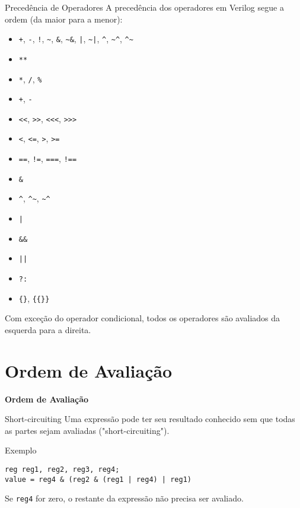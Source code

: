 \documentclass[aspectratio=169,xcolor=dvipsnames]{beamer}
\begin{document}
\begin{frame}[fragile]{Precedência de Operadores}
A precedência dos operadores em Verilog segue a ordem (da maior para a menor):

\begin{itemize}
    \item {\texttt{+}, \texttt{-}, \texttt{!}, \texttt{\textasciitilde}, \texttt{\&}, \texttt{\textasciitilde\&}, \texttt{|}, \texttt{\textasciitilde|}, \texttt{\textasciicircum}, \texttt{\textasciitilde\textasciicircum}, \texttt{\textasciicircum\textasciitilde}}
    \item {\texttt{**}}
    \item {\texttt{*}, \texttt{/}, \texttt{\%}}
    \item {\texttt{+}, \texttt{-}}
    \item {\texttt{<<}, \texttt{>>}, \texttt{<<<}, \texttt{>>>}}
    \item {\texttt{<}, \texttt{<=}, \texttt{>}, \texttt{>=}}
    \item {\texttt{==}, \texttt{!=}, \texttt{===}, \texttt{!==}}
    \item {\texttt{\&}}
    \item {\texttt{\textasciicircum}, \texttt{\textasciicircum\textasciitilde}, \texttt{\textasciitilde\textasciicircum}}
    \item {\texttt{|}}
    \item {\texttt{\&\&}}
    \item {\texttt{||}}
    \item {\texttt{?:}}
    \item {\texttt{\{\}}, \texttt{\{\{\}\}}}
\end{itemize}
\scriptsize{Com exceção do operador condicional, todos os operadores são avaliados da esquerda para a direita.}
\end{frame}

\section{Ordem de Avaliação}

\begin{frame}
    \Huge{\centerline{\textbf{Ordem de Avaliação}}}
\end{frame}

\begin{frame}[fragile]{Short-circuiting}
Uma expressão pode ter seu resultado conhecido sem que todas as partes sejam avaliadas ("short-circuiting").

\begin{block}{Exemplo}
\begin{verbatim}
reg reg1, reg2, reg3, reg4;
value = reg4 & (reg2 & (reg1 | reg4) | reg1)
\end{verbatim}
\end{block}

Se \texttt{reg4} for zero, o restante da expressão não precisa ser avaliado.
\end{frame}
\end{document}

